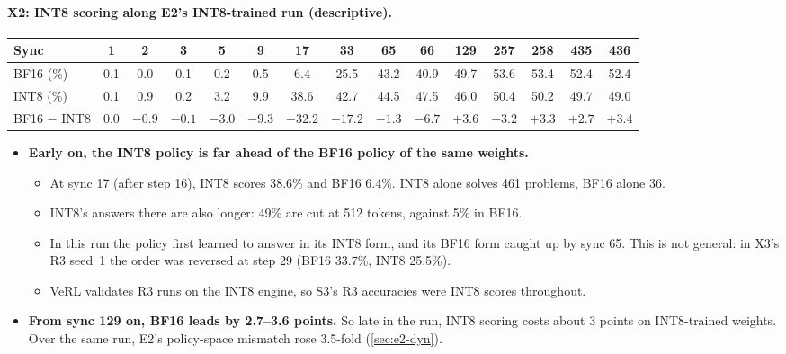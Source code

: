 \documentclass[11pt]{article}
\begin{document}
\paragraph{X2: INT8 scoring along E2's INT8-trained run (descriptive).}
\begin{center}\small\setlength{\tabcolsep}{3pt}
\begin{tabular}{@{}l *{14}{c}@{}}
\toprule
Sync & 1 & 2 & 3 & 5 & 9 & 17 & 33 & 65 & 66 & 129 & 257 & 258 & 435 & 436\\
\midrule
BF16 (\%) & 0.1 & 0.0 & 0.1 & 0.2 & 0.5 & 6.4 & 25.5 & 43.2 & 40.9 & 49.7 & 53.6 & 53.4 & 52.4 & 52.4\\
INT8 (\%) & 0.1 & 0.9 & 0.2 & 3.2 & 9.9 & 38.6 & 42.7 & 44.5 & 47.5 & 46.0 & 50.4 & 50.2 & 49.7 & 49.0\\
BF16 $-$ INT8 & 0.0 & $-0.9$ & $-0.1$ & $-3.0$ & $-9.3$ & $-32.2$ & $-17.2$ & $-1.3$ & $-6.7$ & $+3.6$ & $+3.2$ & $+3.3$ & $+2.7$ & $+3.4$\\
\bottomrule
\end{tabular}
\end{center}
\begin{itemize}
\item \textbf{Early on, the INT8 policy is far ahead of the BF16 policy of the same weights.}
  \begin{itemize}
  \item At sync 17 (after step 16), INT8 scores 38.6\% and BF16 6.4\%. INT8 alone solves 461 problems, BF16 alone 36.
  \item INT8's answers there are also longer: 49\% are cut at 512 tokens, against 5\% in BF16.
  \item In this run the policy first learned to answer in its INT8 form, and its BF16 form caught up by sync 65. This is not general: in X3's R3 seed~1 the order was reversed at step 29 (BF16 33.7\%, INT8 25.5\%).
  \item VeRL validates R3 runs on the INT8 engine, so S3's R3 accuracies were INT8 scores throughout.
  \end{itemize}
\item \textbf{From sync 129 on, BF16 leads by 2.7--3.6 points.} So late in the run, INT8 scoring costs about 3 points on INT8-trained weights. Over the same run, E2's policy-space mismatch rose 3.5-fold (\cref{sec:e2-dyn}).
\end{itemize}
\end{document}
